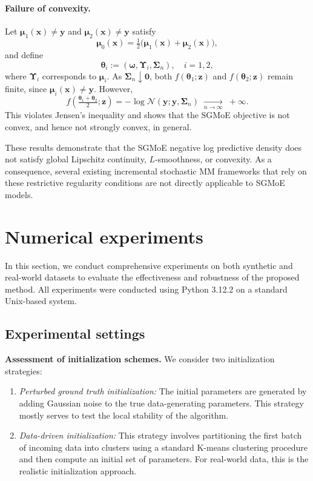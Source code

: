 \documentclass{article}
\newcommand{\zero}{\ensuremath{\mathbf{0}}}
\newcommand{\cN}{\mathcal{N}}
\def\vmu{{\bm{\mu}}}
\def\vomega{{\bm{\omega}}}
\def\vtheta{{\bm{\theta}}}
\def\vx{{\bm{x}}}
\def\vy{{\bm{y}}}
\def\vz{{\bm{z}}}
\def\mSigma{{\bm{\Sigma}}}
\def\mUpsilon{{\bm{\Upsilon}}}
\begin{document}
\paragraph{Failure of convexity.}
Let $\vmu_1(\vx)\neq \vy$ and $\vmu_2(\vx)\neq \vy$ satisfy
\[
\vmu_0(\vx)=\tfrac12\big(\vmu_1(\vx)+\vmu_2(\vx)\big),
\]
and define
\[
\vtheta_i := (\vomega,\mUpsilon_i,\mSigma_n), \quad i=1,2,
\]
where $\mUpsilon_i$ corresponds to $\vmu_i$.
As $\mSigma_n \downarrow \zero$, both $f(\vtheta_1;\vz)$ and $f(\vtheta_2;\vz)$ remain finite, since
$\vmu_i(\vx)\neq \vy$.
However,
\[
f\!\left(\tfrac{\vtheta_1+\vtheta_2}{2};\vz\right)
= -\log \cN(\vy;\vy,\mSigma_n)
\;\xrightarrow[n\to\infty]{}\; +\infty.
\]
This violates Jensen’s inequality and shows that the SGMoE objective is not convex, and hence not strongly convex, in general.

These results demonstrate that the SGMoE negative log predictive density does not satisfy global Lipschitz continuity, $L$-smoothness, or convexity. As a consequence, several existing incremental stochastic MM frameworks that rely on these restrictive regularity conditions are not directly applicable to SGMoE models.




\section{Numerical experiments}\label{sec_experimental_studies}
In this section, we conduct comprehensive experiments on both synthetic and real-world datasets to evaluate the effectiveness and robustness of the proposed method. All experiments were conducted using Python 3.12.2 on a standard Unix-based system.

\subsection{Experimental settings}

{\bf Assessment of initialization schemes.} We consider two initialization strategies:
\begin{enumerate}
    \item \emph{Perturbed ground truth initialization:} The initial parameters are generated by adding Gaussian noise to the true data-generating parameters. This strategy mostly serves to test the local stability of the algorithm. 
    \item \emph{Data-driven initialization:} This strategy involves partitioning the first batch of incoming data into clusters using a standard K-means clustering procedure and then compute an initial set of parameters. For real-world data, this is the realistic initialization approach.
\end{enumerate}
\end{document}

